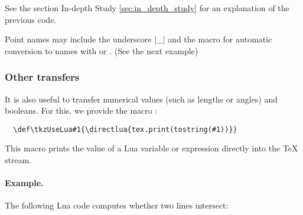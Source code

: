 See the section In-depth Study \ref{sec:in_depth_study} for an explanation of the previous code.

Point names may include the underscore  |_| and the macro  for automatic conversion to names with  or . (See  the next example)

\vspace{1em}

\begin{tkzexample}[latex=7cm]

  \begin{center}
  \end{center}
\end{tkzexample}


\subsubsection{Other transfers} %
\label{ssub:other_transfers}

It is also useful to transfer numerical values (such as lengths or angles) and booleans. For this, we provide the macro :

\begin{mybox}
  \begin{verbatim}
  \def\tkzUseLua#1{\directlua{tex.print(tostring(#1))}} 
\end{verbatim}
\end{mybox}

This macro prints the value of a Lua variable or expression directly into the TeX stream.

\paragraph{Example.} The following Lua code computes whether two lines intersect:


